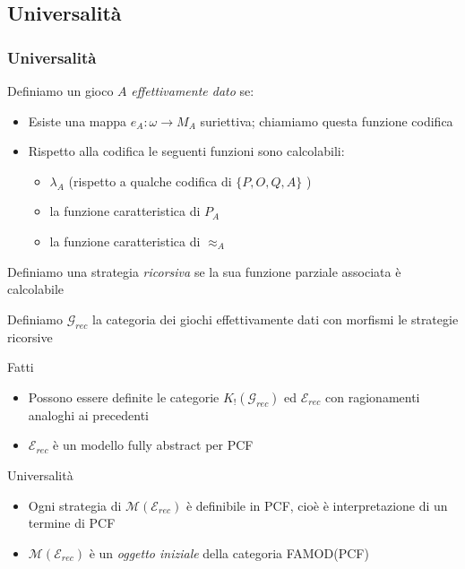 \documentclass{beamer}
\begin{document}
\subsection{Universalità}

\begin{frame}
	
	\frametitle{Universalità}
	
	Definiamo un gioco $A$ \emph{effettivamente dato} se:
	\begin{itemize}
		\item Esiste una mappa $e_A : \omega \rightarrow M_A$ suriettiva; chiamiamo questa funzione codifica
		\item Rispetto alla codifica le seguenti funzioni sono calcolabili:
		\begin{itemize}
			\item $\lambda_A$ (rispetto a qualche codifica di $\{ P,O,Q,A \}$ )
			\item la funzione caratteristica di $P_A$
			\item la funzione caratteristica di $\approx_A$
		\end{itemize}
		
	\end{itemize}
	
	Definiamo una strategia \emph{ricorsiva} se la sua funzione parziale associata è calcolabile
	
	
\end{frame}

\begin{frame}
	
	Definiamo $\mathcal{G}_{rec}$ la categoria dei giochi effettivamente dati con morfismi le strategie ricorsive
	
	\begin{block}{Fatti}
		
		\begin{itemize}
			\item Possono essere definite le categorie $K_!(\mathcal{G}_{rec})$ ed $\mathcal{E}_{rec}$ con ragionamenti analoghi ai precedenti
			\item $\mathcal{E}_{rec}$ è un modello fully abstract per PCF
		\end{itemize}
		
	\end{block}
	
	
	\begin{block}{Universalità}
		
		\begin{itemize}
			\item Ogni strategia di $\mathcal{M}(\mathcal{E}_{rec})$ è definibile in PCF, cioè
		è interpretazione di un termine di PCF
			\item $\mathcal{M}(\mathcal{E}_{rec})$ è un \emph{oggetto iniziale} della categoria FAMOD(PCF)
		\end{itemize}
		
		
	\end{block}

\end{frame}
\end{document}
